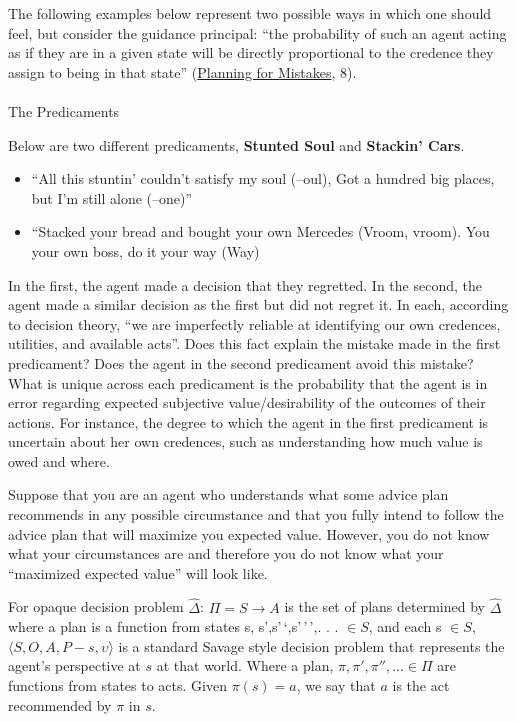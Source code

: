 \documentclass[
  letterpaper,
  DIV=11,
  numbers=noendperiod]{scrartcl}
\makeatletter
\let\oldparagraph\paragraph
\renewcommand{\paragraph}{
    \@ifstar
      \xxxParagraphStar
      \xxxParagraphNoStar
  }
\newcommand{\xxxParagraphStar}[1]{\oldparagraph*{#1}\mbox{}}
\newcommand{\xxxParagraphNoStar}[1]{\oldparagraph{#1}\mbox{}}
\providecommand{\tightlist}{%
  \setlength{\itemsep}{0pt}\setlength{\parskip}{0pt}}
\makeatother
\begin{document}
The following examples below represent two possible ways in which one
should feel, but consider the guidance principal: ``the probability of
such an agent acting as if they are in a given state will be directly
proportional to the credence they assign to being in that state''
(\href{https://app.notion.com/p/Planning-for-Mistakes-36e8935bcf8a8180a08ae53a494f1e59?pvs=21}{Planning
for Mistakes}, 8).

\paragraph{The Predicaments}\label{the-predicaments}

Below are two different predicaments, \textbf{Stunted Soul} and
\textbf{Stackin' Cars}.

\begin{itemize}
\tightlist
\item
  ``All this stuntin' couldn't satisfy my soul (--oul), Got a hundred
  big places, but I'm still alone (--one)''
\item
  ``Stacked your bread and bought your own Mercedes (Vroom, vroom). You
  your own boss, do it your way (Way)
\end{itemize}

In the first, the agent made a decision that they regretted. In the
second, the agent made a similar decision as the first but did not
regret it. In each, according to decision theory, ``we are imperfectly
reliable at identifying our own credences, utilities, and available
acts''. Does this fact explain the mistake made in the first
predicament? Does the agent in the second predicament avoid this
mistake? What is unique across each predicament is the probability that
the agent is in error regarding expected subjective value/desirability
of the outcomes of their actions. For instance, the degree to which the
agent in the first predicament is uncertain about her own credences,
such as understanding how much value is owed and where.

Suppose that you are an agent who understands what some advice plan
recommends in any possible circumstance and that you fully intend to
follow the advice plan that will maximize you expected value. However,
you do not know what your circumstances are and therefore you do not
know what your ``maximized expected value'' will look like.

For opaque decision problem \(\hat{\Delta}\): \(\Pi = S \rightarrow A\)
is the set of plans determined by \(\hat\Delta\) where a plan is a
function from states s, s',s'\,`,s'\,'\,',. . . \(\in S\), and each s
\(\in S\), \(\langle S, O, A, P-{s}, \upsilon \rangle\) is a standard
Savage style decision problem that represents the agent's perspective at
\(s\) at that world. Where a plan, \(\pi, \pi ', \pi '', . . . \in \Pi\)
are functions from states to acts. Given \(\pi(s) = a\), we say that
\(a\) is the act recommended by \(\pi\) in \(s\).
\end{document}
